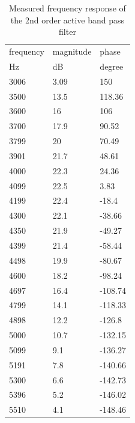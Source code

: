 \begin{table}[!ht]
    \centering
    \begin{tabular}{|l|l|l|}
    \hline
        frequency  & magnitude & phase  \\ 
        Hz & dB & degree \\ \hline \hline
        3006 & 3.09 & 150 \\ \hline
        3500 & 13.5 & 118.36 \\ \hline
        3600 & 16 & 106 \\ \hline
        3700 & 17.9 & 90.52 \\ \hline
        3799 & 20 & 70.49 \\ \hline
        3901 & 21.7 & 48.61 \\ \hline
        4000 & 22.3 & 24.36 \\ \hline
        4099 & 22.5 & 3.83 \\ \hline
        4199 & 22.4 & -18.4 \\ \hline
        4300 & 22.1 & -38.66 \\ \hline
        4350 & 21.9 & -49.27 \\ \hline
        4399 & 21.4 & -58.44 \\ \hline
        4498 & 19.9 & -80.67 \\ \hline
        4600 & 18.2 & -98.24 \\ \hline
        4697 & 16.4 & -108.74 \\ \hline
        4799 & 14.1 & -118.33 \\ \hline
        4898 & 12.2 & -126.8 \\ \hline
        5000 & 10.7 & -132.15 \\ \hline
        5099 & 9.1 & -136.27 \\ \hline
        5191 & 7.8 & -140.66 \\ \hline
        5300 & 6.6 & -142.73 \\ \hline
        5396 & 5.2 & -146.02 \\ \hline
        5510 & 4.1 & -148.46 \\ \hline
    \end{tabular}
    \captionsetup{justification=centering,singlelinecheck=true}
    \caption{Measured frequency response of the 2nd order active band pass filter}
\label{tab:bode_2_2}
\end{table}